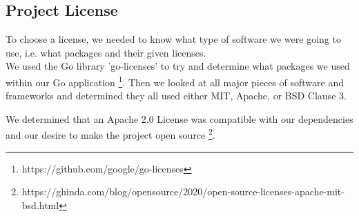 \subsection{Project License}
To choose a license, we needed to know what type of software we were going to use, i.e. what packages and their given licenses. \\

We used the Go library 'go-licenses' to try and determine what packages we used within our Go application \footnote{https://github.com/google/go-licenses}. 
Then we looked at all major pieces of software and frameworks and determined they all used either MIT, Apache, or BSD Clause 3.

We determined that an Apache 2.0 License was compatible with our dependencies and our desire to make the project open source \footnote{https://ghinda.com/blog/opensource/2020/open-source-licenses-apache-mit-bsd.html}. 